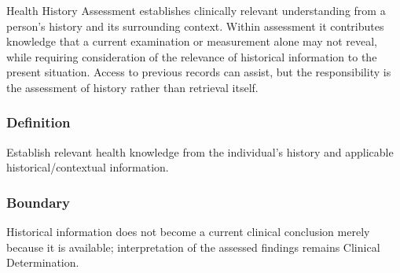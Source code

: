 Health History Assessment establishes clinically relevant understanding from a person's history and its surrounding context. Within assessment it contributes knowledge that a current examination or measurement alone may not reveal, while requiring consideration of the relevance of historical information to the present situation. Access to previous records can assist, but the responsibility is the assessment of history rather than retrieval itself.

\subsubsection*{Definition}

Establish relevant health knowledge from the individual’s history and applicable historical/\allowbreak{}contextual information.

\subsubsection*{Boundary}

Historical information does not become a current clinical conclusion merely because it is available; interpretation of the assessed findings remains Clinical Determination.

